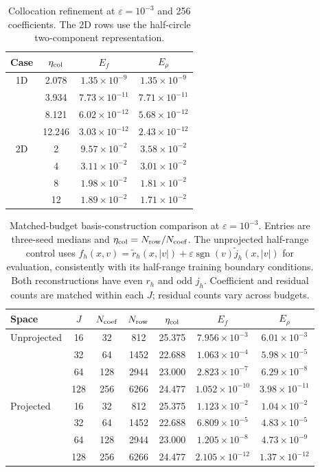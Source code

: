 \begin{table}[!htb]
\centering\small
\setlength{\tabcolsep}{8pt}
\caption{Collocation refinement at $\varepsilon=10^{-3}$ and 256 coefficients. The 2D rows use the half-circle two-component representation.}
\label{tab:collocation}
\begin{tabular}{cccc}
\toprule
Case & $\eta_{\rm col}$ & $E_f$ & $E_\rho$\\
\midrule
1D & 2.078 & $1.35\times10^{-9}$ & $1.35\times10^{-9}$\\
 & 3.934 & $7.73\times10^{-11}$ & $7.71\times10^{-11}$\\
 & 8.121 & $6.02\times10^{-12}$ & $5.68\times10^{-12}$\\
 & 12.246 & $3.03\times10^{-12}$ & $2.43\times10^{-12}$\\
\addlinespace
2D & 2 & $9.57\times10^{-2}$ & $3.58\times10^{-2}$\\
 & 4 & $3.11\times10^{-2}$ & $3.01\times10^{-2}$\\
 & 8 & $1.98\times10^{-2}$ & $1.81\times10^{-2}$\\
 & 12 & $1.89\times10^{-2}$ & $1.71\times10^{-2}$\\
\bottomrule
\end{tabular}
\end{table}

\begin{table}[!htb]
\centering\small
\setlength{\tabcolsep}{3pt}
\caption{Matched-budget basis-construction comparison at $\varepsilon=10^{-3}$. Entries are three-seed medians and $\eta_{\rm col}=N_{\rm row}/N_{\rm coef}$.
The unprojected half-range control uses
$f_h(x,v)=\widetilde r_h(x,|v|)+\varepsilon\operatorname{sgn}(v)\widetilde j_h(x,|v|)$ for evaluation, consistently with its half-range training boundary conditions.
Both reconstructions have even $r_h$ and odd $j_h$. Coefficient and residual counts are matched within each $J$; residual counts vary across budgets.}
\label{tab:parity-budget}
\begin{tabular}{lcccccc}
\toprule
Space & $J$ & $N_{\rm coef}$ & $N_{\rm row}$ & $\eta_{\rm col}$ & $E_f$ & $E_\rho$\\
\midrule
Unprojected & 16 & 32 & 812 & 25.375 & $7.956\times10^{-3}$ & $6.01\times10^{-3}$\\
 & 32 & 64 & 1452 & 22.688 & $1.063\times10^{-4}$ & $5.98\times10^{-5}$\\
 & 64 & 128 & 2944 & 23.000 & $2.823\times10^{-7}$ & $6.29\times10^{-8}$\\
 & 128 & 256 & 6266 & 24.477 & $1.052\times10^{-10}$ & $3.98\times10^{-11}$\\
\addlinespace
Projected & 16 & 32 & 812 & 25.375 & $1.123\times10^{-2}$ & $1.04\times10^{-2}$\\
 & 32 & 64 & 1452 & 22.688 & $6.809\times10^{-5}$ & $4.83\times10^{-5}$\\
 & 64 & 128 & 2944 & 23.000 & $1.205\times10^{-8}$ & $4.73\times10^{-9}$\\
 & 128 & 256 & 6266 & 24.477 & $2.105\times10^{-12}$ & $1.37\times10^{-12}$\\
\bottomrule
\end{tabular}
\end{table}

